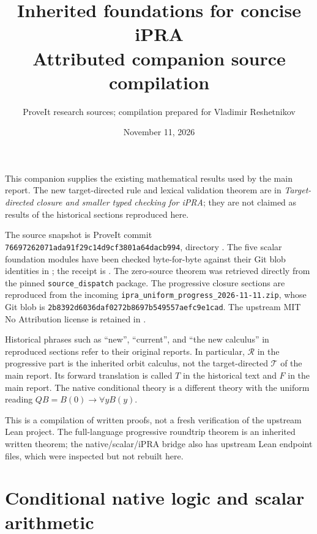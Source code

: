 \documentclass[11pt,a4paper]{article}
\title{\color{ink}\textbf{Inherited foundations for concise iPRA}\\[6pt]\large Attributed companion source compilation}
\author{ProveIt research sources; compilation prepared for Vladimir Reshetnikov}
\date{November 11, 2026}
\theoremstyle{definition}\newtheorem{definition}[theorem]{Definition}
\begin{document}
\maketitle
This companion supplies the existing mathematical results used by the main
report. The new target-directed rule and lexical validation theorem are in
\emph{Target-directed closure and smaller typed checking for iPRA}; they are
not claimed as results of the historical sections reproduced here.

The source snapshot is ProveIt commit
\texttt{76697262071ada91f29c14d9cf3801a64dacb994}, directory
. The five scalar
foundation modules have been checked byte-for-byte against their Git blob
identities in ; the receipt is
. The zero-source theorem was
retrieved directly from the pinned \texttt{source\_dispatch} package. The
progressive closure sections are reproduced from the incoming
\texttt{ipra\_uniform\_progress\_2026-11-11.zip}, whose Git blob is
\texttt{2b8392d6036daf0272b8697b549557aefc9e1cad}. The upstream MIT No
Attribution license is retained in .

Historical phrases such as ``new'', ``current'', and ``the new calculus''
in reproduced sections refer to their original reports. In particular,
$\mathcal R$ in the progressive part is the inherited orbit calculus,
not the target-directed $\mathcal T$ of the main report. Its forward
translation is called $T$ in the historical text and $F$ in the main
report. The native conditional theory is a different theory with the
uniform reading $Q B=B(0)\to\forall y B(y)$.

This is a compilation of written proofs, not a fresh verification of the
upstream Lean project. The full-language progressive roundtrip theorem
is an inherited written theorem; the native/scalar/iPRA bridge also has
upstream Lean endpoint files, which were inspected but not rebuilt here.

\setcounter{tocdepth}{1}
{\small\tableofcontents}
\clearpage
\part{Conditional native logic and scalar arithmetic}





\clearpage
\end{document}
